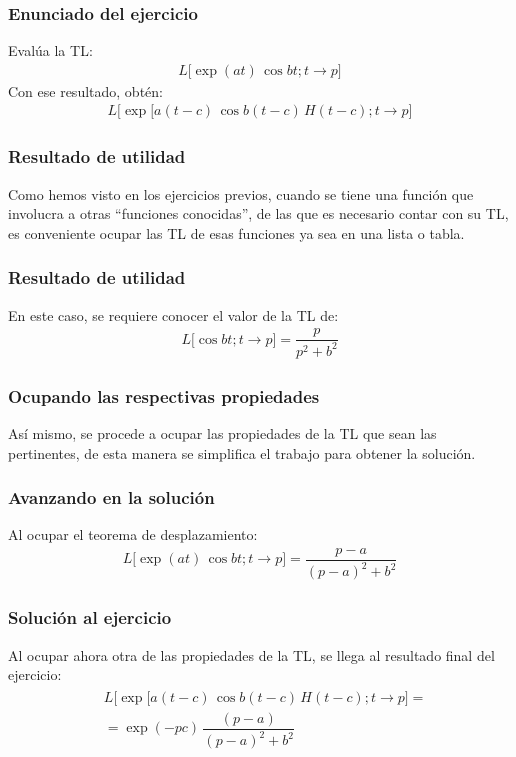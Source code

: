 \documentclass[12pt]{beamer}
\begin{document}
\begin{frame}
\frametitle{Enunciado del ejercicio}
Evalúa la TL:
\pause
\begin{align*}
L \big[ \exp (a t) \, \cos bt; t \to p \big]
\end{align*}
\pause
Con ese resultado, obtén:
\pause
\begin{align*}
L \big[ \exp\big[ a(t - c) \, \cos b (t - c) \, H (t - c); t \to p \big]
\end{align*}
\end{frame}
\begin{frame}
\frametitle{Resultado de utilidad}
Como hemos visto en los ejercicios previos, cuando se tiene una función que involucra a otras \enquote{funciones conocidas}, de las que es necesario contar con su TL, \pause es conveniente ocupar las TL de esas funciones ya sea en una lista o tabla.
\end{frame}
\begin{frame}
\frametitle{Resultado de utilidad}
En este caso, se requiere conocer el valor de la TL de:
\pause
\begin{align*}
L \big[ \cos b t; t \to p \big] = \dfrac{p}{p^{2} + b^{2}}
\end{align*}    
\end{frame}
\begin{frame}
\frametitle{Ocupando las respectivas propiedades}
Así mismo, se procede a ocupar las propiedades de la TL que sean las pertinentes, de esta manera se simplifica el trabajo para obtener la solución.
\end{frame}
\begin{frame}
\frametitle{Avanzando en la solución}
Al ocupar el teorema de desplazamiento:
\pause
\begin{align*}
L \big[ \exp(a t) \, \cos b t; t \to p \big] = \dfrac{p - a}{(p - a)^{2} + b^{2}}
\end{align*}
\end{frame}
\begin{frame}
\frametitle{Solución al ejercicio}
Al ocupar ahora otra de las propiedades de la TL, se llega al resultado final del ejercicio:
\pause
\begin{eqnarray*}
\begin{aligned}
&L \big[ \exp\big[ a(t - c) \, \cos b (t - c) \, H (t - c); t \to p \big] = \\[0.5em]
&= \exp (- p c) \, \dfrac{(p - a)}{(p - a)^{2} + b^{2}}
\end{aligned}
\end{eqnarray*}
\end{frame}
\end{document}
